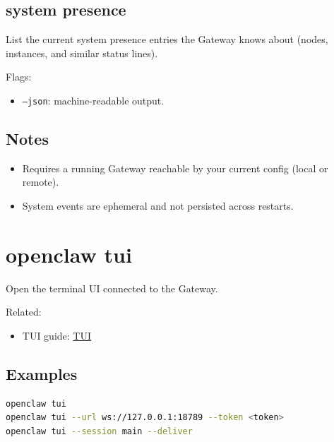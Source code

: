 \subsection{system presence}


List the current system presence entries the Gateway knows about (nodes,
instances, and similar status lines).

Flags:

\begin{itemize}
  \item \texttt{--json}: machine-readable output.
\end{itemize}


\subsection{Notes}


\begin{itemize}
  \item Requires a running Gateway reachable by your current config (local or remote).
  \item System events are ephemeral and not persisted across restarts.
\end{itemize}



\clearpage

\section{openclaw tui}


Open the terminal UI connected to the Gateway.

Related:

\begin{itemize}
  \item TUI guide: \href{/web/tui}{TUI}
\end{itemize}


\subsection{Examples}


\begin{lstlisting}[language=bash]
openclaw tui
openclaw tui --url ws://127.0.0.1:18789 --token <token>
openclaw tui --session main --deliver
\end{lstlisting}



\clearpage

